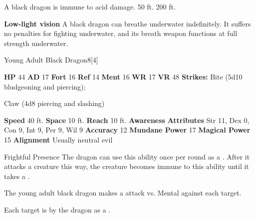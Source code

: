       
       A black dragon is immune to acid damage.
     50 ft.
     200 ft.
    \par\noindent\textbf{Low-light vision}
        A black dragon can breathe underwater indefinitely.
        It suffers no penalties for fighting underwater, and its breath weapon functions at full strength underwater.
  

  \begin{monsubsection}{Young Adult Black Dragon}{8}[4]
    \vspace{-1em}\vspace{-1em}
    \vspace{0em}

    
    

    \begin{spellcontent}
      \begin{spelltargetinginfo}
        \pari \textbf{HP} 44 \monsep
          \textbf{AD} 17 \monsep
          \textbf{Fort} 16 \monsep
          \textbf{Ref} 14 \monsep
          \textbf{Ment} 16
        \pari \textbf{WR} 17 \monsep
        \textbf{VR} 48
        \pari \textbf{Strikes:}
            Bite  (5d10 bludgeoning and piercing);
\par Claw  (4d8 piercing and slashing)
      \end{spelltargetinginfo}
    \end{spellcontent}
    \begin{monsterfooter}
      \pari \textbf{Speed} 40 ft. \monsep
        \textbf{Space} 10 ft. \monsep
        \textbf{Reach} 10 ft.
      \pari \textbf{Awareness} 
      \pari \textbf{Attributes}
        Str 11, Dex 0,
        Con 9, Int 9,
        Per 9, Wil 9
      \pari \textbf{Accuracy} 12 \monsep
        \textbf{Mundane Power} 17 \monsep
      \textbf{Magical Power} 15
      \pari \textbf{Alignment} Usually neutral evil
    \end{monsterfooter}
  \end{monsubsection}
  \begin{freeability}{Frightful Presence}
      The dragon can use this ability once per round as a .
      After it attacks a creature this way, the creature becomes immune to this ability until it takes a .
      \par The young adult black dragon makes a  attack
        vs. Mental against each target.
    
    \hit Each target is  by the dragon as a .
    \end{freeability}
  

